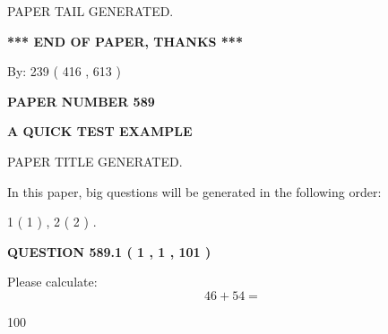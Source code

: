 \documentclass[12pt]{article}
\begin{document}
   
   
\vspace{2.0in} PAPER TAIL GENERATED.
   
   
   
   
\vspace{1.0in} 
{\textbf{\large{ *** END OF PAPER, THANKS *** }}} 
   
   
\hspace{1.0in} By: 
 239 ( 416 ,  613 )
   
   
   
   
\newpage 
\setcounter{page}{ 
   589001 } 
   
   
   
   
 {\textbf{ \Large{ PAPER NUMBER  589  }}}
   
   
\vspace{0.2in}
   
   
   
   
   
   
   
   
 \vspace{0.2in}
{\LARGE {\textbf{ A QUICK TEST EXAMPLE}}}
   
   
 PAPER TITLE GENERATED.
   
   
   
\vspace{0.2in}
   
In this paper, big questions will be generated in the following order: 
   
   
   1 ( 1 )
 ,
   2 ( 2 )
 .
  
\vspace{0.2in}
  
{\textbf{\Large{QUESTION
589.1 
 ( 1 , 1 , 101 )
}}}
  
  
 
Please calculate:
\begin{equation}
46 +  %
54 = \nonumber
\end{equation}
 
 
 
\noindent{}
 
 

100
 
 
\noindent{}
 
 
\end{document}
